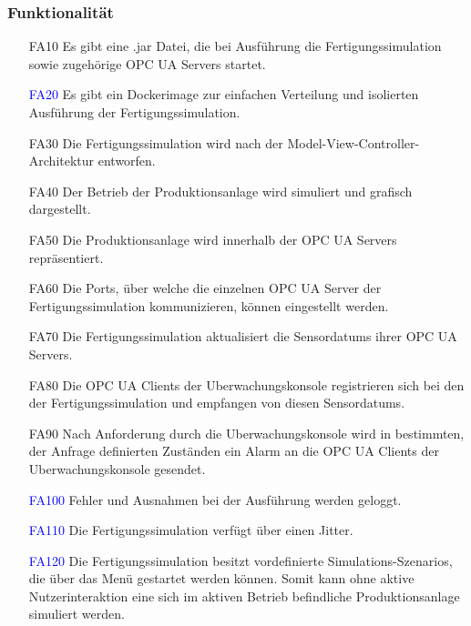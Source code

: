 \documentclass[parskip=full]{scrartcl}
\begin{document}
\subsubsection{Funktionalität}
\begin{enumerate}	
  \item[FA10] Es gibt eine .jar Datei, die bei Ausführung die \gls{Fertigungssimulation} sowie zugehörige \glspl{OPC UA Server} startet.
  \item[\textcolor{blue}{FA20}] Es gibt ein \gls{Dockerimage} zur einfachen Verteilung und isolierten Ausführung der \gls{Fertigungssimulation}.  
  \item[FA30] Die \gls{Fertigungssimulation} wird nach der Model-View-Controller-Architektur entworfen.
  \item[FA40] Der Betrieb der \gls{Produktionsanlage} wird simuliert und grafisch dargestellt.
  \item[FA50] Die \gls{Produktionsanlage} wird innerhalb der \glspl{OPC UA Server} repräsentiert.
  \item[FA60] Die Ports, über welche die einzelnen \gls{OPC UA Server} der \gls{Fertigungssimulation} kommunizieren, können eingestellt werden.
  \item[FA70] Die \gls{Fertigungssimulation} aktualisiert die \glspl{Sensordatum} ihrer \glspl{OPC UA Server}.    
  \item[FA80] Die \glspl{OPC UA Client} der \gls{Uberwachungskonsole} registrieren sich bei den  der \gls{Fertigungssimulation} und empfangen von
    diesen \glspl{Sensordatum}.
  \item[FA90] Nach Anforderung durch die \gls{Uberwachungskonsole} wird in bestimmten, der Anfrage definierten Zust\"anden ein Alarm an die \glspl{OPC UA Client} der \gls{Uberwachungskonsole} gesendet.
  \item[\textcolor{blue}{FA100}] Fehler und Ausnahmen bei der Ausführung werden geloggt.  
  \item[\textcolor{blue}{FA110}] Die \gls{Fertigungssimulation} verfügt über einen \gls{Jitter}.
  \item[\textcolor{blue}{FA120}] Die \gls{Fertigungssimulation} besitzt vordefinierte \glspl{Simulations-Szenario}, die über das Menü gestartet werden können. Somit kann ohne aktive Nutzerinteraktion eine sich
    im aktiven Betrieb befindliche \gls{Produktionsanlage} simuliert werden.
\end{enumerate}
\end{document}
